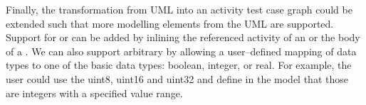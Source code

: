 Finally, the transformation from UML into an activity test case graph could be extended such that more modelling elements from the UML are supported. Support for  or  can be added by inlining the referenced activity of an  or the body of a . We can also support arbitrary  by allowing a user--defined mapping of data types to one of the basic data types: boolean, integer, or real. For example, the user could use the  uint8, uint16 and uint32 and define in the model that those are integers with a specified value range.
